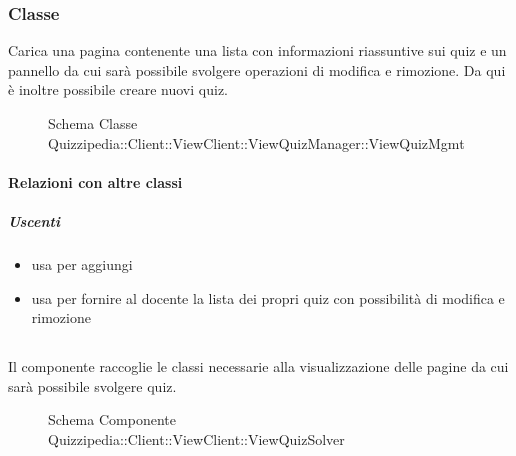 \subsubsection{Classe }
Carica una pagina contenente una lista con informazioni riassuntive sui quiz e un pannello da cui sarà possibile svolgere operazioni di modifica e rimozione. Da qui è inoltre possibile creare nuovi quiz.
\begin{figure}[H]
\centering
\noindent{}
\caption[Schema Classe ViewQuizMgmt]{Schema Classe Quizzipedia::Client::ViewClient::ViewQuizManager::ViewQuizMgmt}
\end{figure}
\paragraph{Relazioni con altre classi}
\subparagraph{Uscenti}
\begin{itemize}
\item usa  per aggiungi
\item usa  per fornire al docente la lista dei propri quiz con possibilità di modifica e rimozione
\end{itemize}
\subsection{}
Il componente raccoglie le classi necessarie alla visualizzazione delle pagine da cui sarà possibile svolgere quiz.
\begin{figure}[H]
\centering
\noindent{}
\caption[Schema Componente Quizzipedia::Client::ViewClient::ViewQuizSolver]{Schema Componente Quizzipedia::Client::ViewClient::ViewQuizSolver}
\end{figure}
